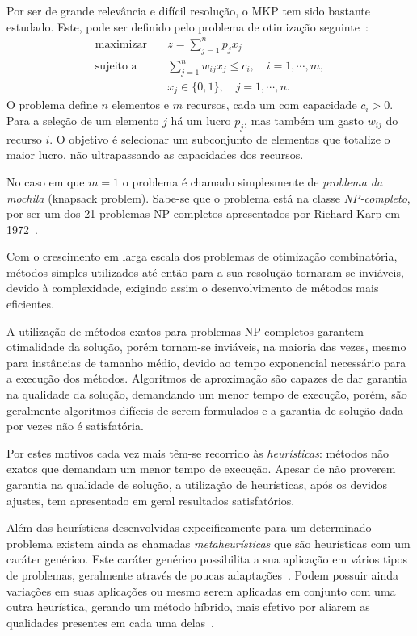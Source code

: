 \documentclass[brazil]{article}
\begin{document}
Por ser de grande relevância e difícil resolução, o MKP tem
sido bastante estudado.
Este, pode ser definido pelo problema de otimização seguinte~\cite{Puchinger2010}:
\begin{align}
  \textrm{maximizar}
    \quad & z = \sum_{j=1}^n p_j x_j \\
  \textrm{sujeito a}
  	\quad & \sum_{j=1}^n w_{ij}x_j \leq c_i, \quad i=1,\cdots,m, \\
          & x_j \in \{0,1\}, \quad j=1,\cdots,n.
\end{align}
O problema define $n$ elementos e $m$ recursos, cada um com capacidade $c_i > 0$.
Para a seleção de um elemento $j$ há um lucro $p_j$, mas também um gasto $w_{ij}$ do recurso $i$.
O objetivo é selecionar um subconjunto de elementos que totalize o maior lucro,
não ultrapassando as capacidades dos recursos.

No caso em que $m = 1$ o problema é chamado simplesmente de \textit{problema
da mochila} (knapsack problem).
Sabe-se que o problema está na classe \textit{NP-completo}, por ser um dos
21 problemas NP-completos apresentados por Richard Karp em 1972~\cite{Karp-1972, Garey1979}.

Com o crescimento em larga escala dos problemas de otimização combinatória,
métodos simples utilizados até então para a sua resolução
tornaram-se inviáveis, devido à complexidade, exigindo assim o desenvolvimento de métodos mais e\-fi\-ci\-en\-tes.

A utilização de métodos exatos para problemas NP-completos garantem otimalidade
da solução, porém tornam-se inviáveis, na maioria das vezes, mesmo para instâncias de tamanho médio,
devido ao tempo exponencial necessário para a execução dos métodos.
Algoritmos de aproximação são capazes de dar garantia na qualidade da solução,
demandando um menor tempo de execução, porém, são geralmente algoritmos difíceis
de serem formulados e a garantia de solução dada por vezes não é satisfatória.

Por estes motivos cada vez mais têm-se recorrido às \textit{heurísticas}: métodos não exatos que
demandam um menor tempo de execução.
Apesar de não proverem garantia na qualidade de solução, a utilização de heurísticas,
após os devidos ajustes, tem apresentado em geral resultados satisfatórios.

Além das heurísticas desenvolvidas expecificamente para um determinado problema
existem ainda as chamadas \textit{metaheurísticas} que são heurísticas com
um caráter genérico.
Este caráter genérico possibilita a sua aplicação em vários tipos de problemas,
geralmente através de poucas adaptações~\cite{Dorigo2013}.
Podem possuir ainda variações em suas aplicações ou mesmo serem aplicadas
em conjunto com uma outra heurística, gerando um método híbrido, mais efetivo
por aliarem as qualidades presentes em cada uma delas~\cite{Blum2003}.
\end{document}
